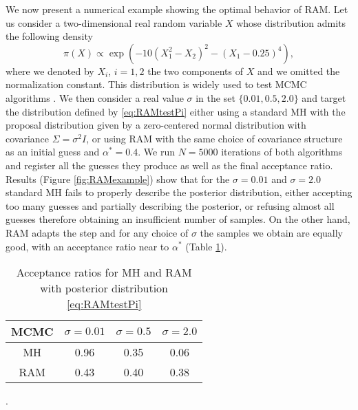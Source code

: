 We now present a numerical example showing the optimal behavior of RAM. Let us consider a two-dimensional real random variable $X$ whose distribution admits the following density
\begin{equation}\label{eq:RAMtestPi}
	\pi(X) \propto \exp(-10(X_1^2 - X_2)^2 - (X_1 - 0.25)^4),
\end{equation}
where we denoted by $X_i$, $i = 1, 2$ the two components of $X$ and we omitted the normalization constant. This distribution is widely used to test MCMC algorithms \cite{KaS05}. We then consider a real value $\sigma$ in the set $\{0.01, 0.5, 2.0\}$ and target the distribution defined by \eqref{eq:RAMtestPi} either using a standard MH with the proposal distribution given by a zero-centered normal distribution with covariance $\Sigma = \sigma^2 I$, or using RAM with the same choice of covariance structure as an initial guess and $\alpha^* = 0.4$. We run $N = 5000$ iterations of both algorithms and register all the guesses they produce as well as the final acceptance ratio. Results (Figure \ref{fig:RAMexample}) show that for the $\sigma = 0.01$ and $\sigma = 2.0$ standard MH fails to properly describe the posterior distribution, either accepting too many guesses and partially describing the posterior, or refusing almost all guesses therefore obtaining an insufficient number of samples. On the other hand, RAM adapts the step and for any choice of $\sigma$ the samples we obtain are equally good, with an acceptance ratio near to $\alpha^*$ (Table \ref{tab:RAMalphaStar}).

\begin{table}[H]
	\centering
	\begin{tabular}{cccc}
		\toprule
		MCMC & $\sigma = 0.01$ & $\sigma = 0.5$ & $\sigma = 2.0$ \\ 
		\midrule
		MH & 0.96  & 0.35  & 0.06  \\
		RAM & 0.43 & 0.40 & 0.38 \\
		\bottomrule
	\end{tabular}
	\caption{Acceptance ratios for MH and RAM with posterior distribution \eqref{eq:RAMtestPi}}.
	\label{tab:RAMalphaStar}
\end{table}



